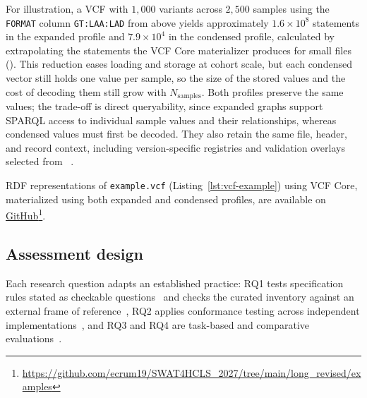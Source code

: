 For illustration, a VCF with \(1{,}000\) variants across \(2{,}500\) samples using the \texttt{FORMAT} column \texttt{GT:LAA:LAD} from above yields approximately \(1.6\times10^{8}\) statements in the expanded profile and \(7.9\times10^{4}\) in the condensed profile, calculated by extrapolating the statements the VCF Core materializer produces for small files (\href{https://github.com/ecrum19/SWAT4HCLS_2027/tree/main/long_revised/scripts}{}).
This reduction eases loading and storage at cohort scale, but each condensed vector still holds one value per sample, so the size of the stored values and the cost of decoding them still grow with \(N_{\mathrm{samples}}\).
Both profiles preserve the same values; the trade-off is direct queryability, since expanded graphs support SPARQL access to individual sample values and their relationships, whereas condensed values must first be decoded.
They also retain the same file, header, and record context, including version-specific registries and validation overlays selected from ~\cite{vcfc210}.

RDF representations of \texttt{example.vcf} (Listing~\ref{lst:vcf-example}) using VCF Core, materialized using both expanded and condensed profiles, are available on \href{https://github.com/ecrum19/SWAT4HCLS_2027/tree/main/long_revised/examples}{GitHub}\footnote{\url{https://github.com/ecrum19/SWAT4HCLS_2027/tree/main/long_revised/examples}}.

\subsection{Assessment design}
Each research question adapts an established practice: RQ1 tests specification rules stated as checkable questions~\cite{gruninger1995methodology,samod2016} and checks the curated inventory against an external frame of reference~\cite{gomezperez2001evaluation}, RQ2 applies conformance testing across independent implementations~\cite{bishop2005conformance,niu2022interop}, and RQ3 and RQ4 are task-based and comparative evaluations~\cite{sabou2012ontologyevaluation}.

